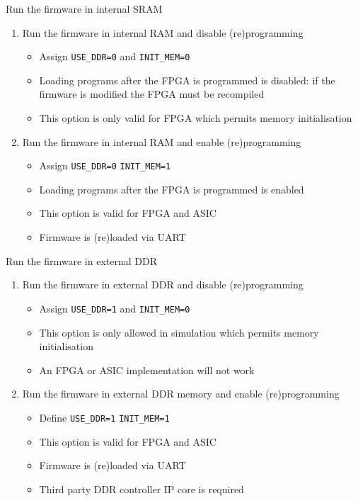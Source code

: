\documentclass [xcolor=svgnames, t] {beamer}
\begin{document}
\begin{frame}{Run the firmware in internal SRAM}
\begin{enumerate}
\item Run the firmware in internal RAM and disable (re)programming
  \begin{itemize}
  \item Assign {\tt USE\_DDR=0} and {\tt INIT\_MEM=0}
  \item Loading programs after the FPGA is programmed is disabled: if the firmware is modified the FPGA must be recompiled
  \item This option is only valid for FPGA which permits memory initialisation
  \end{itemize}
\item Run the firmware in internal RAM and enable (re)programming
  \begin{itemize}
  \item Assign {\tt USE\_DDR=0} {\tt INIT\_MEM=1}
  \item Loading programs after the FPGA is programmed is enabled
  \item This option is valid for FPGA and ASIC
  \item Firmware is (re)loaded via UART
  \end{itemize}
\end{enumerate}
\end{frame}

\begin{frame}{Run the firmware in external DDR}
\begin{enumerate}
\item Run the firmware in external DDR and disable (re)programming
  \begin{itemize}
  \item Assign {\tt USE\_DDR=1} and {\tt INIT\_MEM=0}
  \item This option is only allowed in simulation which permits memory initialisation
  \item An FPGA or ASIC implementation will not work
  \end{itemize}
\item Run the firmware in external DDR memory and enable (re)programming
  \begin{itemize}
  \item Define {\tt USE\_DDR=1} {\tt INIT\_MEM=1}
  \item This option is valid for FPGA and ASIC
  \item Firmware is (re)loaded via UART
  \item Third party DDR controller IP core is required
  \end{itemize}
\end{enumerate}
\end{frame}
\end{document}
